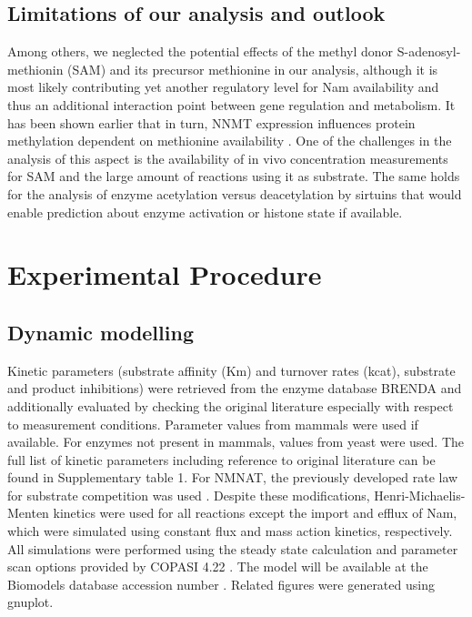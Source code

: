 \subsection{Limitations of our analysis and outlook}

Among others, we neglected the potential effects of the methyl donor S-adenosyl-methionin (SAM) and its precursor methionine in our analysis, although it is most likely contributing yet another regulatory level for Nam availability and thus an additional interaction point between gene regulation and metabolism. It has been shown earlier that in turn, NNMT expression influences protein methylation dependent on methionine availability \cite{Ulanovskaya2013}. One of the challenges in the analysis of this aspect is the availability of in vivo concentration measurements for SAM and the large amount of reactions using it as substrate. The same holds for the analysis of enzyme acetylation versus deacetylation by sirtuins that would enable prediction about enzyme activation or histone state if available.


\section{Experimental Procedure}

\subsection{Dynamic modelling}

Kinetic parameters (substrate affinity (Km) and turnover rates (kcat), substrate and product inhibitions) were retrieved from the enzyme database BRENDA and additionally evaluated by checking the original literature especially with respect to measurement conditions. Parameter values from mammals were used if available. For enzymes not present in mammals, values from yeast were used. The full list of kinetic parameters including reference to original literature can be found in Supplementary table 1. For NMNAT, the previously developed rate law for substrate competition was used \cite{Schauble2013}. Despite these modifications, Henri-Michaelis-Menten kinetics were used for all reactions except the import and efflux of Nam, which were simulated using constant flux and mass action kinetics, respectively. All simulations were performed using the steady state calculation and parameter scan options provided by COPASI 4.22 \cite{Hoops2006}. The model will be available at the Biomodels database accession number . Related figures were generated using gnuplot.


